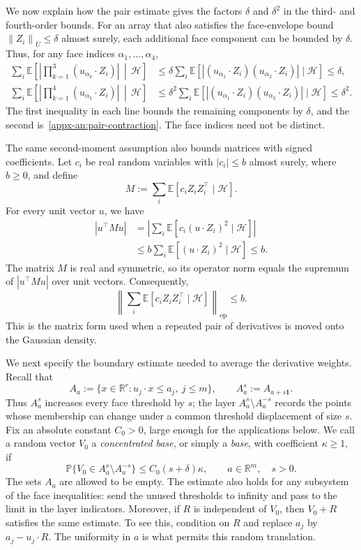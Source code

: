 \documentclass[11pt,letterpaper,twoside,leqno]{article}
\theoremstyle{bookplain}
\theoremstyle{bookremark}
\newcommand{\E}{\mathbb E}
\newcommand{\Pp}{\mathbb P}
\newcommand{\R}{\mathbb R}
\newcommand{\norm}[1]{\left\lVert#1\right\rVert}
\begin{document}
We now explain how the pair estimate gives the factors $\delta$ and
$\delta^2$ in the third- and fourth-order bounds. For an array that
also satisfies the face-envelope bound $\norm{Z_i}_U\le\delta$
almost surely, each additional face component can be bounded by
$\delta$. Thus, for any face indices $\alpha_1,\ldots,\alpha_4$,
\[
 \begin{aligned}
 \sum_i\E\!\left[
   \left|\prod_{k=1}^3(u_{\alpha_k}\cdot Z_i)\right|
   \,\middle|\,\mathcal H\right]
 &\le\delta\sum_i\E[
   |(u_{\alpha_1}\cdot Z_i)(u_{\alpha_2}\cdot Z_i)|
   \mid\mathcal H]\le\delta,\\
 \sum_i\E\!\left[
   \left|\prod_{k=1}^4(u_{\alpha_k}\cdot Z_i)\right|
   \,\middle|\,\mathcal H\right]
 &\le\delta^2\sum_i\E[
   |(u_{\alpha_1}\cdot Z_i)(u_{\alpha_2}\cdot Z_i)|
   \mid\mathcal H]\le\delta^2.
 \end{aligned}
\]
The first inequality in each line bounds the remaining components
by $\delta$, and the second is~\eqref{appx-an:pair-contraction}.
The face indices need not be distinct.

The same second-moment assumption also bounds matrices with signed
coefficients. Let $c_i$ be real random variables with $|c_i|\le b$
almost surely, where $b\ge0$, and define
\[
 M:=\sum_i\E[c_iZ_iZ_i^\top\mid\mathcal H].
\]
For every unit vector $u$, we have
\[
 \begin{aligned}
 |u^\top Mu|
 &=\left|\sum_i\E[c_i(u\cdot Z_i)^2\mid\mathcal H]\right|\\
 &\le b\sum_i\E[(u\cdot Z_i)^2\mid\mathcal H]\le b.
 \end{aligned}
\]
The matrix $M$ is real and symmetric, so its operator norm equals
the supremum of $|u^\top Mu|$ over unit vectors. Consequently,
\[
 \left\|\sum_i\E[c_iZ_iZ_i^\top\mid\mathcal H]\right\|_{\mathrm{op}}
 \le b.
\]
This is the matrix form used when a repeated pair of derivatives
is moved onto the Gaussian density.

We next specify the boundary estimate needed to average the
derivative weights. Recall that
\[
 A_a:=\{x\in\R^r:u_j\cdot x\le a_j,\ j\le m\},
 \qquad A_a^s:=A_{a+s\mathbf1}.
\]
Thus \(A_a^s\) increases every face threshold by \(s\); the layer
\(A_a^s\setminus A_a^{-s}\) records the points whose membership can
change under a common threshold displacement of size \(s\).
Fix an absolute constant \(C_0>0\), large enough for the applications
below. We call a random vector \(V_0\) a \emph{concentrated base},
or simply a \emph{base}, with coefficient \(\kappa\ge1\), if
\begin{equation}
 \Pp\{V_0\in A_a^s\setminus A_a^{-s}\}
 \le C_0(s+\delta)\kappa,
 \qquad a\in\R^m,\quad s>0.
 \label{appx-an:concentration}
\end{equation}
The sets \(A_a\) are allowed to be empty. The estimate also holds
for any subsystem of the face inequalities: send the unused
thresholds to infinity and pass to the limit in the layer
indicators. Moreover, if \(R\) is independent of \(V_0\), then
\(V_0+R\) satisfies the same estimate. To see this, condition on
\(R\) and replace \(a_j\) by \(a_j-u_j\cdot R\). The uniformity
in \(a\) is what permits this random translation.
\end{document}

